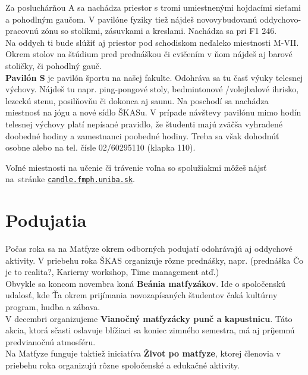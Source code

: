 Za posluchárňou A sa nachádza priestor s tromi umiestnenými hojdacími sieťami a pohodlným gaučom. V pavilóne fyziky tiež nájdeš novovybudovanú oddychovo-pracovnú zónu so stolíkmi, zásuvkami a kreslami. Nachádza sa pri F1 246.\\

Na oddych ti bude slúžiť aj priestor pod schodiskom neďaleko miestnosti M-VII. Okrem stolov na štúdium pred prednáškou či cvičením v ňom nájdeš aj barové stoličky, či pohodlný gauč. \\

\textbf{Pavilón S} je pavilón športu na našej fakulte. Odohráva sa tu časť výuky telesnej výchovy. Nájdeš tu napr. ping-pongové stoly, bedmintonové /volejbalové ihrisko, lezeckú stenu, posilňovňu či dokonca aj saunu. Na poschodí sa nachádza miestnosť na jógu a nové sídlo ŠKASu. V prípade návštevy pavilónu mimo hodín telesnej výchovy platí nepísané pravidlo, že študenti majú zväčša vyhradené doobedné hodiny a zamestnanci poobedné hodiny. Treba sa však dohodnúť osobne alebo na tel. čísle 02/60295110 (klapka 110). %

Voľné miestnosti na učenie či trávenie voľna so spolužiakmi môžeš
nájsť na~stránke \href{https://candle.fmph.uniba.sk}{\texttt{candle.fmph.uniba.sk}}. 


\section{Podujatia}

Počas roka sa na Matfyze okrem odborných podujatí odohrávajú aj oddychové
aktivity. V priebehu roka ŠKAS organizuje rôzne prednášky, napr. (prednáška Čo je to realita?, Karierny workshop, Time management atď.) \\

Obvykle sa koncom novembra koná \textbf{Beánia matfyzákov}. Ide o
spoločenskú udalosť, kde Ťa okrem prijímania novozapísaných študentov čaká kultúrny program, hudba a zábava.\\

V decembri organizujeme \textbf{Vianočný matfyzácky punč a kapustnicu}.
Táto akcia, ktorá sčasti oslavuje blížiaci sa koniec zimného semestra,
má aj príjemnú predvianočnú atmosféru.\\


Na Matfyze funguje taktiež iniciatíva \textbf{Život po matfyze}, ktorej členovia v priebehu roka organizujú rôzne spoločenské a edukačné aktivity. 

